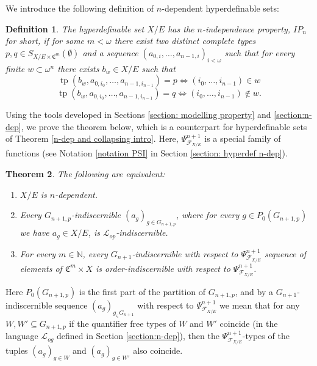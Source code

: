 \documentclass{amsart}
\newtheorem{teor}{Theorem}[section]
\newtheorem*{teorsin}{Theorem}
\newtheorem{defin}[teor]{Definition}
\newtheorem{external claim}[teor]{Claim}
\newcommand{\C}{{\mathfrak C}}
\newcommand{\mL}{\mathcal{L}}
\DeclareMathOperator{\tp}{{tp}}
\begin{document}

We introduce the following definition of $n$-dependent hyperdefinable sets:
\begin{defin} The hyperdefinable set $X/E$ has the $n$-independence property, $IP_n$ for short, if for some $m<\omega$ there exist two distinct complete types $p,q\in S_{X/E\times \C^m}(\emptyset)$ and a sequence $(a_{0,i},\dots, a_{n-1,i})_{i< \omega}$ such that for every finite $w\subset \omega^n$ there exists $b_w\in X/E$ such that $$\tp(b_w, a_{0,i_0},\dots, a_{n-1,i_{n-1}}  )=p \iff (i_0,\dots, i_{n-1})\in w$$ $$\tp(b_w, a_{0,i_0},\dots, a_{n-1,i_{n-1}}  )=q \iff (i_0,\dots, i_{n-1})\notin w. $$ 
\end{defin}
Using the tools developed in Sections \ref{section: modelling property} and \ref{section:n-dep}, we prove the theorem below, %
 which is a counterpart for hyperdefinable sets of Theorem \ref{n-dep and collapsing intro}. Here, $\Psi^{n+1}_{\mathcal{F}_{X/E}}$  is a special family of functions (see Notation \ref{notation PSI} in Section \ref{section: hyperdef n-dep}).
\begin{teor}\label{ndep an collapsing hyperim intro}
 The following are equivalent:
    \begin{enumerate}
        \item $X/E$ is $n$-dependent.
        \item Every $G_{n+1,p}$-indiscernible $(a_g)_{g\in G_{n+1,p}}$, where for every $g\in P_0(G_{n+1,p})$ we have $a_g\in X/E$, is $\mL_{op}$-indiscernible.
        \item For every $m\in \mathbb{N}$, every $G_{n+1}$-indiscernible with respect to $\Psi^{n+1}_{\mathcal{F}_{X/E}}$ sequence of elements of $\C^m\times X$  is order-indiscernible with respect to $ \Psi^{n+1}_{\mathcal{F}_{X/E}}$.
    \end{enumerate}
\end{teor}
Here $P_0(G_{n+1,p})$ is the first part of the partition of $G_{n+1,p}$, and by a $G_{n+1}$-indiscernible sequence $(a_g)_{g_\in G_{n+1}}$ with respect to $\Psi^{n+1}_{\mathcal{F}_{X/E}}$  we mean that for any $W,W'\subseteq G_{n+1,p}$ if the quantifier free types of $W$ and $W'$ coincide (in the language $\mL_{og}$ defined in Section \ref{section:n-dep}), then the $\Psi^{n+1}_{\mathcal{F}_{X/E}}$-types of the tuples $(a_g)_{g\in W}$ and $(a_g)_{g\in W'}$ also coincide.
\end{document}
